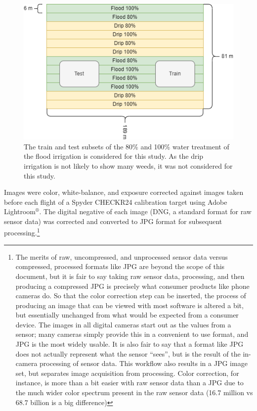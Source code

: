\documentclass[letterpaper]{article}
\begin{document}
{\begin{figure}[h!]
	\centering
	\includegraphics[width=0.8\linewidth]{./figures/test-area.png}
	\caption[Field layout for image acquisition]{The train and test subsets of the 80\% and 100\% water treatment of the flood irrigation is considered for this study. As the drip irrigation is not likely to show many weeds, it was not considered for this study.}
	\label{fig:field-layout}
\end{figure}

Images were color, white-balance, and exposure corrected against images taken before each flight of a Spyder CHECKR24 calibration target using Adobe Lightroom$^{\circledR}$. The digital negative of each image (DNG, a standard format for raw sensor data) was corrected and converted to JPG format for subsequent processing.\footnote{The merits of raw, uncompressed, and unprocessed sensor data versus compressed, processed formats like JPG are beyond the scope of this document, but it is fair to say taking raw sensor data, processing, and then producing a compressed JPG is precisely what consumer products like phone cameras do. So that the color correction step can be inserted, the process of producing an image that can be viewed with most software is altered a bit, but essentially unchanged from what would be expected from a consumer device. The images in all digital cameras start out as the values from a sensor; many cameras simply provide this in a convenient to use format, and JPG is the most widely usable. It is also fair to say that a format like JPG does not actually represent what the sensor ``sees'', but is the result of the in-camera processing of sensor data. This workflow also results in a JPG image set, but separates image acquisition from processing. Color correction, for instance, is more than a bit easier with raw sensor data than a JPG due to  the much wider color spectrum present in the raw sensor data (16.7 million vs 68.7 billion is a big difference)}

}
\end{document}
